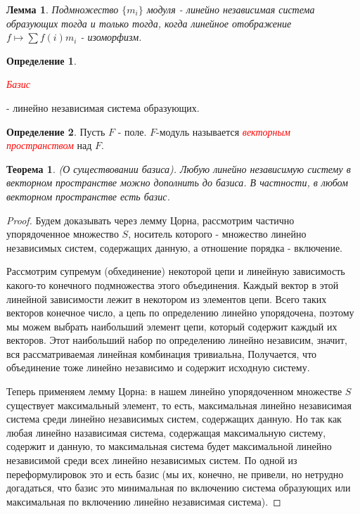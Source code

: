 \documentclass[a4paper,100pt]{article}
\theoremstyle{indented}
\newtheorem{theorem}{Теорема}
\newtheorem{lemma}{Лемма}
\theoremstyle{definition}
\newtheorem{defn}{Определение}
\theoremstyle{remark}
\begin{document}
\begin{lemma}
    Подмножество $\{m_i\}$ модуля - линейно независимая система образующих тогда и только тогда, когда линейное отображение $f\mapsto \sum f(i)m_i$ - изоморфизм.
\end{lemma}

\begin{defn}
    \hypertarget{n45}{\textcolor{red}{\textit{Базис}}} - линейно независимая система образующих.
\end{defn}

\begin{defn}
    Пусть $F$ - поле. $F$-модуль называется \hypertarget{n46}{\textcolor{red}{\textit{векторным пространством}}} над $F$.
\end{defn}

\begin{theorem}
    (О существовании базиса). Любую линейно независимую систему в векторном пространстве можно дополнить до базиса. В частности, в любом векторном пространстве есть базис.
\end{theorem}

\begin{proof}
    Будем доказывать через лемму Цорна, рассмотрим частично упорядоченное множество $S$, носитель которого - множество линейно независимых систем, содержащих данную, а отношение порядка - включение.\ 

    Рассмотрим супремум (обхединение) некоторой цепи и линейную зависимость какого-то конечного подмножества этого объединения. Каждый вектор в этой линейной зависимости лежит в некотором из элементов цепи. Всего таких векторов конечное число, а цепь по определению линейно упорядочена, поэтому мы можем выбрать наибольший элемент цепи, который содержит каждый их векторов. Этот наибольший набор по определению линейно независим, значит, вся рассматриваемая линейная комбинация тривиальна, Получается, что объединение тоже линейно независимо и содержит исходную систему.\ 

    Теперь применяем лемму Цорна: в нашем линейно упорядоченном множестве $S$ существует максимальный элемент, то есть, максимальная линейно независимая система среди линейно независимых систем, содержащих данную. Но так как любая линейно назависимая система, содержащая максимальную систему, содержит и данную, то максимальная система будет максимальной линейно независимой среди всех линейно независимых систем. По одной из переформулировок это и есть базис (мы их, конечно, не привели, но нетрудно догадаться, что базис это минимальная по включению система образующих или максимальная по включению линейно независимая система).
\end{proof}
\end{document}
